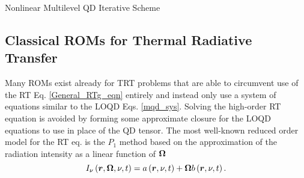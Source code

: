 	
	\begin{algorithm}[ht!]
		\SetAlgoLined
		\caption{Nonlinear Multilevel QD Iterative Scheme \label{alg:mlqd_alg}}
	\end{algorithm}
	
\subsection{Classical ROMs for Thermal Radiative Transfer} \label{sec:classical_roms}
	Many ROMs exist already for TRT problems that are able to circumvent use of the RT Eq. \eqref{General_RTg_eqn} entirely and instead only use a system of equations similar to the LOQD Eqs. \eqref{mqd_sys}. Solving the high-order RT equation is avoided by forming some approximate closure for the LOQD equations to use in place of the QD tensor. The most well-known reduced order model for the RT eq. is the $P_1$ method based on the approximation of the radiation intensity as a linear function of $\bm{\Omega}$ \cite{olson-auer-hall-2000}
	\begin{equation}
		I_{\nu}\left(\bm{r},\bm{\Omega},\nu,t\right) = a\left(\bm{r},\nu,t\right) + \bm{\Omega} b\left(\bm{r},\nu,t\right).
	\end{equation}
	
